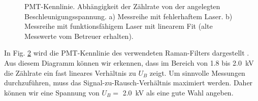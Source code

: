 \documentclass[11pt]{article}
\begin{document}
\begin{figure}[htbp]
    \centering
    \begin{subfigure}{0.45\textwidth}
        \centering
        \caption{}
        \label{fig:fehler}
    \end{subfigure}
    \hfill
    \begin{subfigure}{0.45\textwidth}
        \centering
        \caption{}
        \label{fig:gegeben}
    \end{subfigure}
    \caption{PMT-Kennlinie. Abhängigkeit der Zählrate von der angelegten Beschleunigungsspannung. a) Messreihe mit fehlerhaftem Laser. b) Messreihe mit funktionsfähigem Laser mit linearem Fit (alte Messwerte vom Betreuer erhalten).}
    \label{fig:PMT_Kennlinie}
\end{figure}

In Fig. \ref{fig:gegeben} wird die PMT-Kennlinie des verwendeten Raman-Filters dargestellt . Aus diesem Diagramm können wir erkennen, dass im Bereich von \num{1.8} bis \SI{2.0}{\kilo\volt} die Zählrate ein fast lineares Verhältnis zu $U_B$ zeigt. 
Um sinnvolle Messungen durchzuführen, muss das Signal-zu-Rausch-Verhältnis maximiert werden. Daher können wir eine Spannung von $U_B =$ \SI{2.0}{\kilo\volt} als eine gute Wahl angeben.
\end{document}
